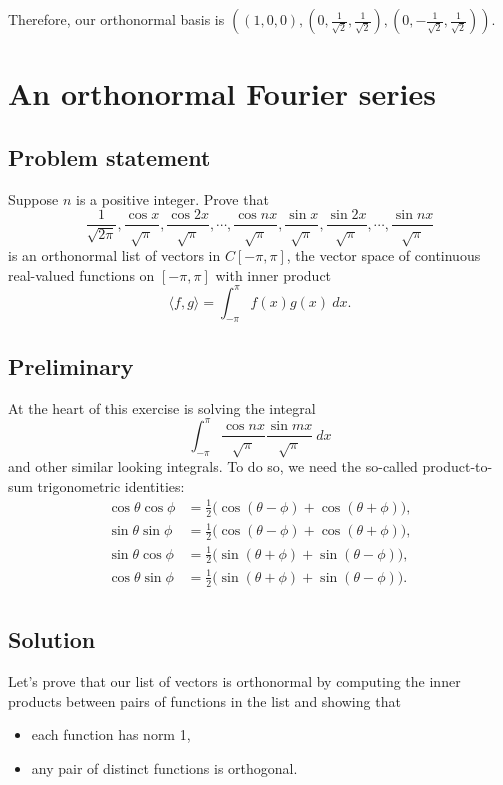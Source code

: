 \documentclass{article}
\begin{document}
Therefore, our orthonormal basis is $((1,0,0),(0,\frac{1}{\sqrt{2}},\frac{1}{\sqrt{2}}),(0,-\frac{1}{\sqrt{2}},\frac{1}{\sqrt{2}}))$.

\clearpage

\section{An orthonormal Fourier series}
\subsection*{Problem statement}
Suppose $n$ is a positive integer. 
Prove that
\[\frac{1}{\sqrt{2\pi}},\frac{\cos x}{\sqrt{\pi}},\frac{\cos 2x}{\sqrt{\pi}},\cdots,\frac{\cos nx}{\sqrt{\pi}},\frac{\sin x}{\sqrt{\pi}},\frac{\sin 2x}{\sqrt{\pi}},\cdots,\frac{\sin nx}{\sqrt{\pi}}\]
is an orthonormal list of vectors in $C[-\pi,\pi]$, the vector space of continuous real-valued functions on $[-\pi,\pi]$ with inner product
\[\langle f,g\rangle=\int_{-\pi}^{\pi}f(x)g(x)\ dx.\]

\subsection*{Preliminary}
At the heart of this exercise is solving the integral
\[\int_{-\pi}^{\pi}\frac{\cos nx}{\sqrt{\pi}}\frac{\sin mx}{\sqrt{\pi}}\ dx\]
and other similar looking integrals. 
To do so, we need the so-called product-to-sum trigonometric identities:
\begin{align*}
    \cos\theta \cos\phi&=\frac{1}{2}\big( \cos(\theta-\phi)+\cos(\theta+\phi)\big),\\
    \sin\theta \sin\phi&=\frac{1}{2}\big( \cos(\theta-\phi)+\cos(\theta+\phi)\big),\\
    \sin\theta \cos\phi&=\frac{1}{2}\big( \sin(\theta+\phi)+\sin(\theta-\phi)\big),\\
    \cos\theta \sin\phi&=\frac{1}{2}\big( \sin(\theta+\phi)+\sin(\theta-\phi)\big).\\
\end{align*}

\subsection*{Solution}
Let's prove that our list of vectors is orthonormal by computing the inner products between pairs of functions in the list and showing that
\begin{itemize}
    \item each function has norm 1,
    \item any pair of distinct functions is orthogonal.
\end{itemize}
\end{document}
